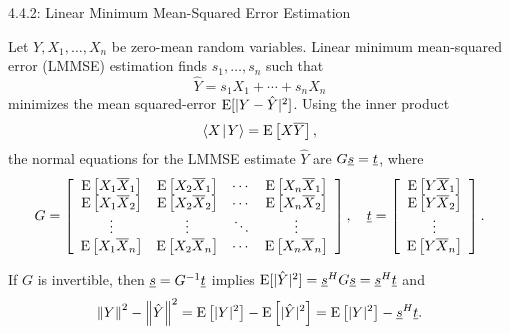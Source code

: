 \documentclass[10pt,english,aspectratio=169]{beamer}
\begin{document}
\begin{frame}{4.4.2: Linear Minimum Mean-Squared Error Estimation}

Let $Y, X_1, \ldots, X_n$ be zero-mean random variables.
Linear minimum mean-squared error (LMMSE) estimation finds $s_1, \ldots, s_n$ such that
\[ \hat{Y} = s_1 X_1 + \cdots + s_n X_n \]
minimizes the mean squared-error $\mathrm{E}[|Y-\hat{Y}|^2]$.
Using the inner product
\begin{equation*}
{\left\langle  X  \mskip2mu \middle| \mskip2mu  Y  \right\rangle} = \mathrm{E} \left[ X \overline{Y} \right],
\end{equation*}
the normal equations for the LMMSE estimate $\hat{Y}$ are $G \underline{s} = \underline{t}$, where
\begin{equation*}
G = \left[ \begin{array}{cccc}
\mathrm{E} \left[ X_1 \overline{X}_1 \right]
& \mathrm{E} \left[ X_2 \overline{X}_1 \right] & \cdots
& \mathrm{E} \left[ X_n \overline{X}_1 \right] \\
\mathrm{E} \left[ X_1 \overline{X}_2 \right]
& \mathrm{E} \left[ X_2 \overline{X}_2 \right] & \cdots
& \mathrm{E} \left[ X_n \overline{X}_2 \right] \\
\vdots & \vdots & \ddots & \vdots \\
\mathrm{E} \left[ X_1 \overline{X}_n \right]
& \mathrm{E} \left[ X_2 \overline{X}_n \right] & \cdots
& \mathrm{E} \left[ X_n \overline{X}_n \right] \\
\end{array} \right], \quad \underline{t} = \left[ \begin{array}{c}
\mathrm{E} \left[ Y \overline{X}_1 \right] \\
\mathrm{E} \left[ Y \overline{X}_2 \right] \\ \vdots \\
\mathrm{E} \left[ Y \overline{X}_n \right] \end{array} \right].
\end{equation*}

If $G$ is invertible, then $\underline{s} = G^{-1} \underline{t}$ implies $\mathrm{E} [|\hat{Y}|^2] = \underline{s}^H G \underline{s} = \underline{s}^H \underline{t}$ and
\begin{equation*}
\left\| Y \right\|^2 - \left\| \hat{Y} \right\|^2 
= \mathrm{E} \left[ |Y|^2 \right]
- \mathrm{E} \left[ |\hat{Y}|^2 \right] = \mathrm{E} \left[ |Y|^2 \right] - \underline{s}^H \underline{t}.
\end{equation*}

\end{frame}
\end{document}
